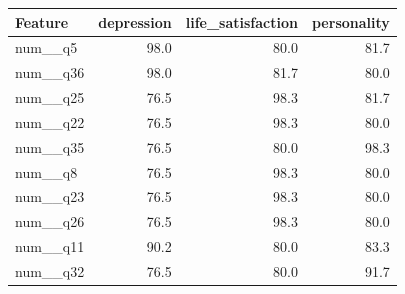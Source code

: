 \begin{tabular}{lrrr}
\toprule
Feature & depression & life_satisfaction & personality \\
\midrule
num__q5 & 98.0 & 80.0 & 81.7 \\
num__q36 & 98.0 & 81.7 & 80.0 \\
num__q25 & 76.5 & 98.3 & 81.7 \\
num__q22 & 76.5 & 98.3 & 80.0 \\
num__q35 & 76.5 & 80.0 & 98.3 \\
num__q8 & 76.5 & 98.3 & 80.0 \\
num__q23 & 76.5 & 98.3 & 80.0 \\
num__q26 & 76.5 & 98.3 & 80.0 \\
num__q11 & 90.2 & 80.0 & 83.3 \\
num__q32 & 76.5 & 80.0 & 91.7 \\
\bottomrule
\end{tabular}

